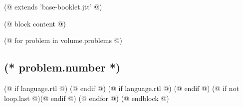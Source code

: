 (@ extends 'base-booklet.jtt' @)

(@ block content @)


    \pagestyle{online}

    (@ for problem in volume.problems @)%
        \setcounter{volume}{(* volume.number *)}%
        \setcounter{problem}{(* problem.number *)}%
        \subsection{\texorpdfstring{(* problem.number *)}{(* problem.number *). (* problem.id *)}}%
        \label{ssc:problem-(* problem.id*)}%
        (@ if language.rtl @) \arabicfont\setRL (@ endif @)
        (@ if language.rtl @) \unsetRL (@ endif @)
        (@ if not loop.last @)\newpage(@ endif @)
    (@ endfor @)
    \newpage
(@ endblock @)
